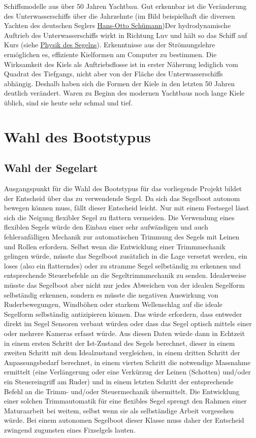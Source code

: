 Schiffsmodelle aus über 50 Jahren Yachtbau. Gut erkennbar ist die Veränderung des Unterwasserschiffs über die Jahrzehnte (im Bild beispielhaft die diversen Yachten des deutschen Seglers \href{https://de.wikipedia.org/wiki/Hans-Otto_Sch\%C3\%BCmann}{Hans-Otto Schümann})Der hydrodynamische Auftrieb des Unterwasserschiffs wirkt in Richtung Luv und hält so das Schiff auf Kurs (siehe \href{https://de.wikipedia.org/wiki/Physik_des_Segelns}{Physik des Segelns}). Erkenntnisse aus der Strömungslehre ermöglichen es, effiziente Kielformen am Computer zu bestimmen. Die Wirksamkeit des Kiels als Auftriebsflosse ist in erster Näherung lediglich vom Quadrat des Tiefgangs, nicht aber von der Fläche des Unterwasserschiffs abhängig. Deshalb haben sich die Formen der Kiele in den letzten 50 Jahren deutlich verändert. Waren zu Beginn des modernen Yachtbaus noch lange Kiele üblich, sind sie heute sehr schmal und tief. 

 


\section{Wahl des Bootstypus}
\subsection{Wahl der Segelart}
Ausgangspunkt für die Wahl des Bootstypus für das vorliegende Projekt bildet der Entscheid über das zu verwendende Segel. Da sich das Segelboot autonom bewegen können muss, fällt dieser Entscheid leicht. Nur mit einem Festsegel lässt sich die Neigung flexibler Segel zu flattern vermeiden. 
Die Verwendung eines flexiblen Segels würde den Einbau einer sehr aufwändigen und auch fehleranfälligen Mechanik zur automatischen Trimmung des Segels mit Leinen und Rollen erfordern. 
Selbst wenn die Entwicklung einer Trimmmechanik gelingen würde, müsste das Segelboot zusätzlich in die Lage versetzt werden, ein loses (also ein flatterndes) oder zu stramme Segel selbständig zu erkennen und entsprechende Steuerbefehle an die Segeltrimmmechanik zu senden. Idealerweise müsste das Segelboot aber nicht nur jedes Abweichen von der idealen Segelform selbständig erkennen, sondern es müsste die negativen Auswirkung von Ruderbewegungen, Windböhen oder starkem Wellenschlag auf die ideale Segelform selbständig antizipieren können. Das würde erfordern, dass entweder direkt im Segel Sensoren verbaut würden oder dass das Segel optisch mittels einer oder mehrere Kameras erfasst würde. Aus diesen Daten würde dann in Echtzeit in einem ersten Schritt der Ist-Zustand des Segels berechnet, dieser in einem zweiten Schritt mit dem Idealzustand vergleichen, in einem dritten Schritt der Anpassungsbedarf berechnet, in einem vierten Schritt die notwendige Massnahme ermittelt (eine Verlängerung oder eine Verkürzug der Leinen (Schotten) und/oder ein Steuereingriff am Ruder) und in einem letzten Schritt der entsprechende Befehl an die Trimm- und/oder Steuermechanik übermittelt. Die Entwicklung einer solchen Trimmautomatik für eine flexibles Segel sprengt den Rahmen einer Maturaarbeit bei weitem, selbst wenn sie als selbständige Arbeit vorgesehen würde. 
Bei einem autonomen Segelboot dieser Klasse muss daher der Entscheid zwingend zugunsten eines Fixselgels lauten.
